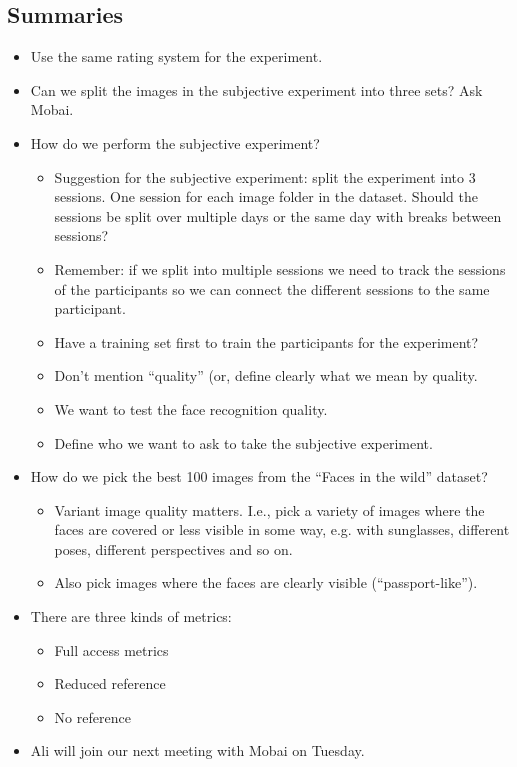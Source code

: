 \subsection*{Summaries}
\begin{itemize}
    \item Use the same rating system for the experiment.
    \item Can we split the images in the subjective experiment into three sets? Ask Mobai.
    \item How do we perform the subjective experiment?
    \begin{itemize}
        \item Suggestion for the subjective experiment: split the experiment into 3 sessions. One session for each image folder in the dataset. Should the sessions be split over multiple days or the same day with breaks between sessions?
        \item Remember: if we split into multiple sessions we need to track the sessions of the participants so we can connect the different sessions to the same participant.
        \item Have a training set first to train the participants for the experiment?
        \item Don’t mention “quality” (or, define clearly what we mean by quality.
        \item We want to test the face recognition quality.
        \item Define who we want to ask to take the subjective experiment.
    \end{itemize}
    \item How do we pick the best 100 images from the “Faces in the wild” dataset?
    \begin{itemize}
        \item Variant image quality matters. I.e., pick a variety of images where the faces are covered or less visible in some way, e.g. with sunglasses, different poses, different perspectives and so on.
        \item Also pick images where the faces are clearly visible (“passport-like”).
    \end{itemize}
    \item There are three kinds of metrics:
    \begin{itemize}
        \item Full access metrics
        \item Reduced reference
        \item No reference
    \end{itemize}
    \item Ali will join our next meeting with Mobai on Tuesday.
\end{itemize}

